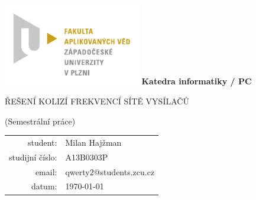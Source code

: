\begin{center}
%
\includegraphics[width=60mm]{pics/favlogo.pdf}
%
\vfill
%
{\large\bf Katedra informatiky / PC}

{\large ŘEŠENÍ KOLIZÍ FREKVENCÍ SÍTĚ VYSÍLAČŮ}

{\large (Semestrální práce)}
%
\vfill
%
\end{center}
%
\vspace{2cm}
%
\begin{tabular}{rl}
student: & Milan Hajžman \\
\noalign{\vspace{2mm}}
studijní číslo: & A13B0303P \\
\noalign{\vspace{2mm}}
email: & qwerty2@students.zcu.cz \\
\noalign{\vspace{2mm}}
datum: & \today \\
\end{tabular}

